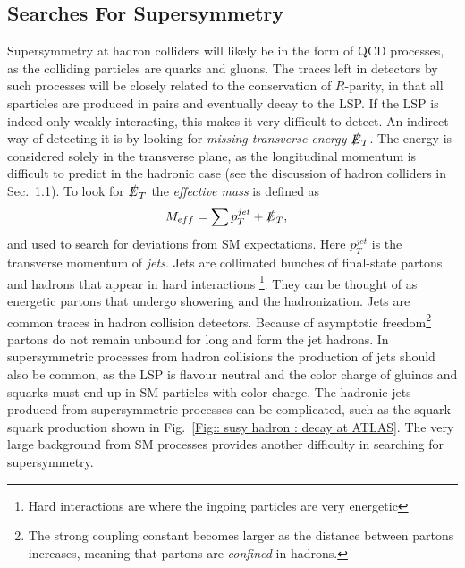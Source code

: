 \documentclass[twoside,english]{uiofysmaster}
\begin{document}
{%
%

\subsection{Searches For Supersymmetry}

Supersymmetry at hadron colliders will likely be in the form of QCD processes, as the colliding particles are quarks and gluons. The traces left in detectors by such processes will be closely related to the conservation of $R$-parity, in that all sparticles are produced in pairs and eventually decay to the LSP. If the LSP is indeed only weakly interacting, this makes it very difficult to detect. An indirect way of detecting it is by looking for \textit{missing transverse energy} $\slashed{E}_T$. The energy is considered solely in the transverse plane, as the longitudinal momentum is difficult to predict in the hadronic case (see the discussion of hadron colliders in Sec.\ 1.1). To look for $\slashed{E}_T$ the \textit{effective mass} is defined as
\begin{align}
M_{eff} &= \sum p_T^{jet} + \slashed{E}_T,
\end{align} 
and used to search for deviations from SM expectations. Here $p_T^{jet}$ is the transverse momentum of \textit{jets}. Jets are collimated bunches of final-state partons and hadrons that appear in hard interactions \footnote{Hard interactions are where the ingoing particles are very energetic}. They can be thought of as energetic partons that undergo showering and the hadronization. Jets are common traces in hadron collision detectors. Because of asymptotic freedom\footnote{The strong coupling constant becomes larger as the distance between partons increases, meaning that partons are \textit{confined} in hadrons.} partons do not remain unbound for long and form the jet hadrons. In supersymmetric processes from hadron collisions the production of jets should also be common, as the LSP is flavour neutral and the color charge of gluinos and squarks must end up in SM particles with color charge. The hadronic jets produced from supersymmetric processes can be complicated, such as the squark-squark production shown in Fig.~\ref{Fig:: susy hadron : decay at ATLAS}. The very large background from SM processes provides another difficulty in searching for supersymmetry. 

}
\end{document}
